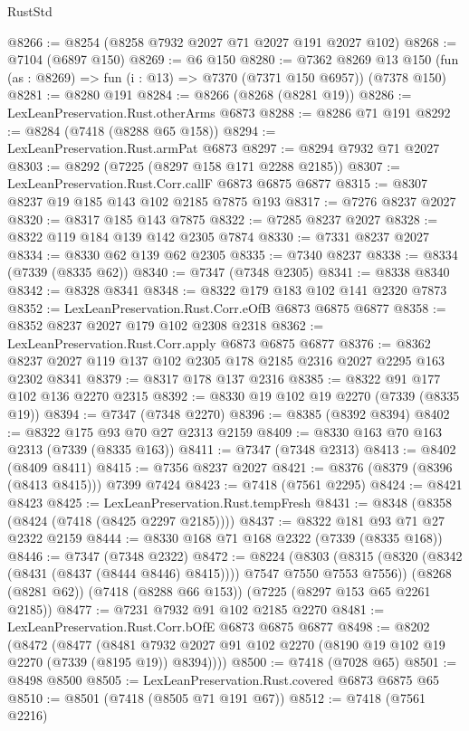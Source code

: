 \begin{lexlean}{RustStd}
\begin{coremodule}
@8266 := @8254 (@8258 @7932 @2027 @71 @2027 @191 @2027 @102)
@8268 := @7104 (@6897 @150)
@8269 := @6 @150
@8280 := @7362
    @8269
    @13
    @150
    (fun (as : @8269) => fun (i : @13) => @7370 (@7371 @150 @6957))
    (@7378 @150)
@8281 := @8280 @191
@8284 := @8266 (@8268 (@8281 @19))
@8286 := LexLeanPreservation.Rust.otherArms @6873
@8288 := @8286 @71 @191
@8292 := @8284 (@7418 (@8288 @65 @158))
@8294 := LexLeanPreservation.Rust.armPat @6873
@8297 := @8294 @7932 @71 @2027
@8303 := @8292 (@7225 (@8297 @158 @171 @2288 @2185))
@8307 := LexLeanPreservation.Rust.Corr.callF @6873 @6875 @6877
@8315 := @8307 @8237 @19 @185 @143 @102 @2185 @7875 @193
@8317 := @7276 @8237 @2027
@8320 := @8317 @185 @143 @7875
@8322 := @7285 @8237 @2027
@8328 := @8322 @119 @184 @139 @142 @2305 @7874
@8330 := @7331 @8237 @2027
@8334 := @8330 @62 @139 @62 @2305
@8335 := @7340 @8237
@8338 := @8334 (@7339 (@8335 @62))
@8340 := @7347 (@7348 @2305)
@8341 := @8338 @8340
@8342 := @8328 @8341
@8348 := @8322 @179 @183 @102 @141 @2320 @7873
@8352 := LexLeanPreservation.Rust.Corr.eOfB @6873 @6875 @6877
@8358 := @8352 @8237 @2027 @179 @102 @2308 @2318
@8362 := LexLeanPreservation.Rust.Corr.apply @6873 @6875 @6877
@8376 := @8362 @8237 @2027 @119 @137 @102 @2305 @178 @2185 @2316 @2027 @2295 @163 @2302 @8341
@8379 := @8317 @178 @137 @2316
@8385 := @8322 @91 @177 @102 @136 @2270 @2315
@8392 := @8330 @19 @102 @19 @2270 (@7339 (@8335 @19))
@8394 := @7347 (@7348 @2270)
@8396 := @8385 (@8392 @8394)
@8402 := @8322 @175 @93 @70 @27 @2313 @2159
@8409 := @8330 @163 @70 @163 @2313 (@7339 (@8335 @163))
@8411 := @7347 (@7348 @2313)
@8413 := @8402 (@8409 @8411)
@8415 := @7356 @8237 @2027
@8421 := @8376 (@8379 (@8396 (@8413 @8415))) @7399 @7424
@8423 := @7418 (@7561 @2295)
@8424 := @8421 @8423
@8425 := LexLeanPreservation.Rust.tempFresh
@8431 := @8348 (@8358 (@8424 (@7418 (@8425 @2297 @2185))))
@8437 := @8322 @181 @93 @71 @27 @2322 @2159
@8444 := @8330 @168 @71 @168 @2322 (@7339 (@8335 @168))
@8446 := @7347 (@7348 @2322)
@8472 := @8224
    (@8303 (@8315 (@8320 (@8342 (@8431 (@8437 (@8444 @8446) @8415)))) @7547 @7550 @7553 @7556))
    (@8268 (@8281 @62))
    (@7418 (@8288 @66 @153))
    (@7225 (@8297 @153 @65 @2261 @2185))
@8477 := @7231 @7932 @91 @102 @2185 @2270
@8481 := LexLeanPreservation.Rust.Corr.bOfE @6873 @6875 @6877
@8498 := @8202
    (@8472
      (@8477
        (@8481 @7932 @2027 @91 @102 @2270 (@8190 @19 @102 @19 @2270 (@7339 (@8195 @19)) @8394))))
@8500 := @7418 (@7028 @65)
@8501 := @8498 @8500
@8505 := LexLeanPreservation.Rust.covered @6873 @6875 @65
@8510 := @8501 (@7418 (@8505 @71 @191 @67))
@8512 := @7418 (@7561 @2216)

\end{coremodule}
\end{lexlean}
